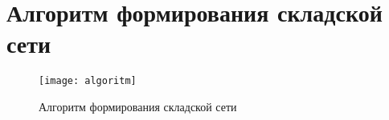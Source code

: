\section{Алгоритм формирования складской сети}

\begin{figure}[h]
	\centering
	\texttt{[image: algoritm]}
	\caption{Алгоритм формирования складской сети}
	\label{fig:algoritm}
\end{figure}
